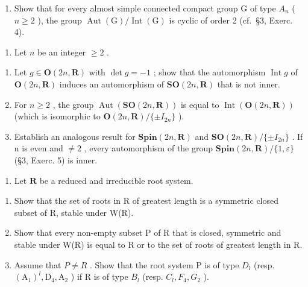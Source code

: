 \begin{enumerate}
\def\labelenumi{\alph{enumi})}
\setcounter{enumi}{1}
\tightlist
\item
  Show that for every almost simple connected compact group G of type \(A_{n}\) ( \(n \geq 2\) ), the group \(\operatorname{Aut}(\mathrm{G})/\operatorname{Int}(\mathrm{G})\) is cyclic of order 2 (cf.~§3, Exerc. 4).
\end{enumerate}

\begin{enumerate}
\def\labelenumi{\arabic{enumi})}
\setcounter{enumi}{3}
\tightlist
\item
  Let \(n\) be an integer \(\geq 2\) .
\end{enumerate}

\begin{enumerate}
\def\labelenumi{\alph{enumi})}
\item
  Let \(g \in \mathbf{O}(2n, \mathbf{R})\) with \(\det g = -1\) ; show that the automorphism \(\operatorname{Int} g\) of \(\mathbf{O}(2n, \mathbf{R})\) induces an automorphism of \(\mathbf{SO}(2n, \mathbf{R})\) that is not inner.
\item
  For \(n \geq 2\) , the group \(\operatorname{Aut}(\mathbf{SO}(2n, \mathbf{R}))\) is equal to \(\operatorname{Int}(\mathbf{O}(2n, \mathbf{R}))\) (which is isomorphic to \(\mathbf{O}(2n, \mathbf{R}) / \{\pm I_{2n}\}\) ).
\item
  Establish an analogous result for \(\mathbf{Spin}(2n,\mathbf{R})\) and \(\mathbf{SO}(2n,\mathbf{R})/\{\pm I_{2n}\}\) . If n is even and \(\neq 2\) , every automorphism of the group \(\mathbf{Spin}(2n,\mathbf{R})/\{1,\varepsilon\}\) (§3, Exerc. 5) is inner.
\end{enumerate}

\begin{enumerate}
\def\labelenumi{\arabic{enumi})}
\setcounter{enumi}{4}
\tightlist
\item
  Let \(\mathbf{R}\) be a reduced and irreducible root system.
\end{enumerate}

\begin{enumerate}
\def\labelenumi{\alph{enumi})}
\item
  Show that the set of roots in R of greatest length is a symmetric closed subset of R, stable under W(R).
\item
  Show that every non-empty subset P of R that is closed, symmetric and stable under W(R) is equal to R or to the set of roots of greatest length in R.
\item
  Assume that \(P \neq R\) . Show that the root system P is of type \(D_{l}\) (resp. \((\mathrm{A}_{1})^{l}, \mathrm{D}_{4}, \mathrm{A}_{2}\) ) if R is of type \(B_{l}\) (resp. \(C_{l}, F_{4}, G_{2}\) ).
\end{enumerate}

